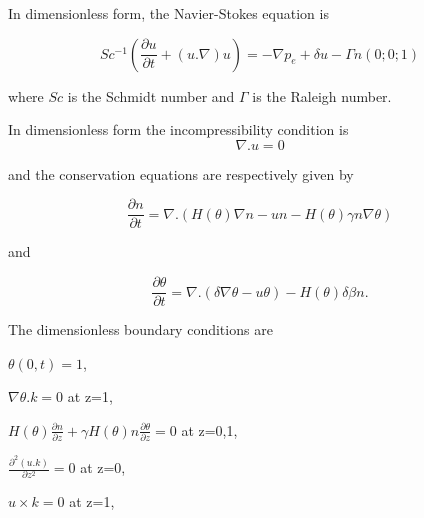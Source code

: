 \documentclass[]{article}
\numberwithin{equation}{section}		%
\begin{document}
In dimensionless form, the Navier-Stokes equation is

\begin{equation}
Sc^{-1} (\frac{\partial u}{\partial t} + (u.\nabla)u) = -\nabla p_e + \delta u -\Gamma n (0;0;1) \nonumber
\end{equation}

where $Sc$ is the Schmidt number and $\Gamma$ is the Raleigh number.

In dimensionless form the incompressibility condition is
\begin{equation}
\nabla . u = 0 \nonumber
\end{equation}

and the conservation equations are respectively given by

\begin{equation}
\frac{\partial n}{\partial t} = \nabla.(H(\theta) \nabla n-un-H(\theta)\gamma n \nabla \theta) \nonumber
\end{equation}

and

\begin{equation}
\frac {\partial \theta}{\partial t} = \nabla . (\delta \nabla \theta - u\theta)-H(\theta)\delta \beta n. \nonumber
\end{equation}

The dimensionless boundary conditions are

\begin{center}
$\theta(0,t) = 1$,\\
 \end{center}

\begin{center}
$\nabla \theta . k =0 $ at z=1,\\
 \end{center}

\begin{center}
$H(\theta)\frac{\partial n}{\partial z} + \gamma H(\theta) n \frac{\partial \theta}{\partial z} = 0$ at z=0,1,\\
 \end{center}

\begin{center}
$\frac{\partial^2 (u.k)}{\partial z^2} = 0$ at z=0,\\
 \end{center}

\begin{center}
$u \times k = 0$ at z=1,\\
 \end{center}
\end{document}
